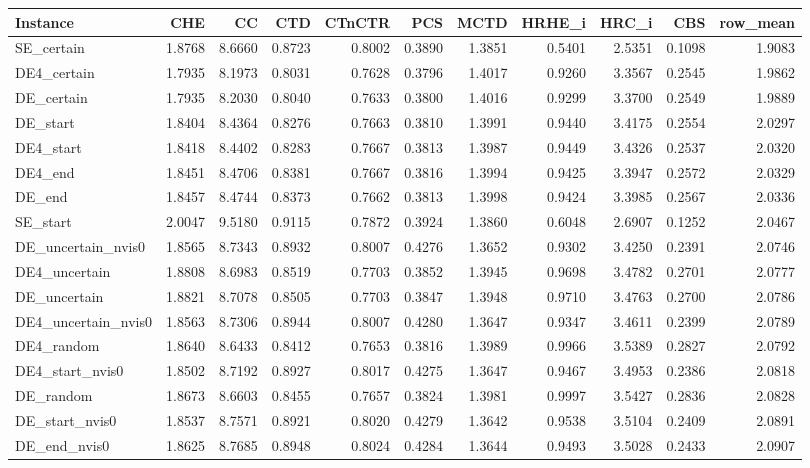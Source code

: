 \begin{tabular}{lrrrrrrrrrr}
\toprule
Instance & CHE & CC & CTD & CTnCTR & PCS & MCTD & HRHE_i & HRC_i & CBS & row_mean \\
\midrule
SE_certain & 1.8768 & 8.6660 & 0.8723 & 0.8002 & 0.3890 & 1.3851 & 0.5401 & 2.5351 & 0.1098 & 1.9083 \\
DE4_certain & 1.7935 & 8.1973 & 0.8031 & 0.7628 & 0.3796 & 1.4017 & 0.9260 & 3.3567 & 0.2545 & 1.9862 \\
DE_certain & 1.7935 & 8.2030 & 0.8040 & 0.7633 & 0.3800 & 1.4016 & 0.9299 & 3.3700 & 0.2549 & 1.9889 \\
DE_start & 1.8404 & 8.4364 & 0.8276 & 0.7663 & 0.3810 & 1.3991 & 0.9440 & 3.4175 & 0.2554 & 2.0297 \\
DE4_start & 1.8418 & 8.4402 & 0.8283 & 0.7667 & 0.3813 & 1.3987 & 0.9449 & 3.4326 & 0.2537 & 2.0320 \\
DE4_end & 1.8451 & 8.4706 & 0.8381 & 0.7667 & 0.3816 & 1.3994 & 0.9425 & 3.3947 & 0.2572 & 2.0329 \\
DE_end & 1.8457 & 8.4744 & 0.8373 & 0.7662 & 0.3813 & 1.3998 & 0.9424 & 3.3985 & 0.2567 & 2.0336 \\
SE_start & 2.0047 & 9.5180 & 0.9115 & 0.7872 & 0.3924 & 1.3860 & 0.6048 & 2.6907 & 0.1252 & 2.0467 \\
DE_uncertain_nvis0 & 1.8565 & 8.7343 & 0.8932 & 0.8007 & 0.4276 & 1.3652 & 0.9302 & 3.4250 & 0.2391 & 2.0746 \\
DE4_uncertain & 1.8808 & 8.6983 & 0.8519 & 0.7703 & 0.3852 & 1.3945 & 0.9698 & 3.4782 & 0.2701 & 2.0777 \\
DE_uncertain & 1.8821 & 8.7078 & 0.8505 & 0.7703 & 0.3847 & 1.3948 & 0.9710 & 3.4763 & 0.2700 & 2.0786 \\
DE4_uncertain_nvis0 & 1.8563 & 8.7306 & 0.8944 & 0.8007 & 0.4280 & 1.3647 & 0.9347 & 3.4611 & 0.2399 & 2.0789 \\
DE4_random & 1.8640 & 8.6433 & 0.8412 & 0.7653 & 0.3816 & 1.3989 & 0.9966 & 3.5389 & 0.2827 & 2.0792 \\
DE4_start_nvis0 & 1.8502 & 8.7192 & 0.8927 & 0.8017 & 0.4275 & 1.3647 & 0.9467 & 3.4953 & 0.2386 & 2.0818 \\
DE_random & 1.8673 & 8.6603 & 0.8455 & 0.7657 & 0.3824 & 1.3981 & 0.9997 & 3.5427 & 0.2836 & 2.0828 \\
DE_start_nvis0 & 1.8537 & 8.7571 & 0.8921 & 0.8020 & 0.4279 & 1.3642 & 0.9538 & 3.5104 & 0.2409 & 2.0891 \\
DE_end_nvis0 & 1.8625 & 8.7685 & 0.8948 & 0.8024 & 0.4284 & 1.3644 & 0.9493 & 3.5028 & 0.2433 & 2.0907 \\

\end{tabular}
